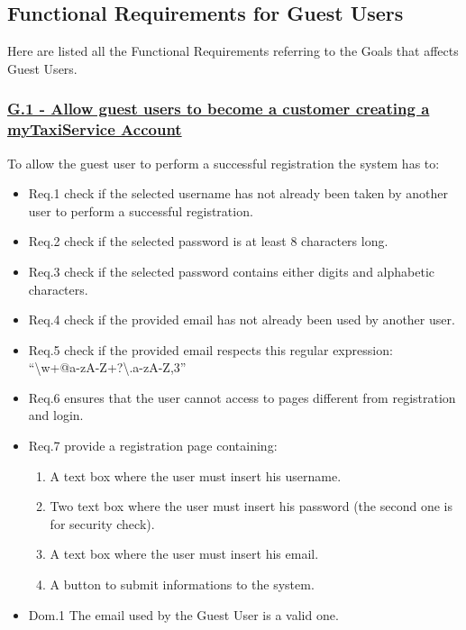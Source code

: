 \documentclass{report}
\begin{document}
		\subsection{Functional Requirements for Guest Users}
		Here are listed all the Functional Requirements referring to the Goals that affects Guest Users.

			\subsubsection{\lbrack \hyperref[sec:g1]{G.1 - Allow guest users to become a customer creating a myTaxiService Account}\rbrack}\label{sec:frs1}
			To allow the guest user to perform a successful registration the system has to:

				\begin{itemize}
					\item \lbrack Req.1\rbrack \label{sec:fr1_g1} check if the selected username has not already been taken by another user to perform a successful registration.
					\item \lbrack Req.2\rbrack \label{sec:fr2_g1} check if the selected password is at least 8 characters long.
					\item \lbrack Req.3\rbrack \label{sec:fr3_g1} check if the selected password contains either digits and alphabetic characters.
					\item \lbrack Req.4\rbrack \label{sec:fr4_g1} check if the provided email has not already been used by another user.
					\item \lbrack Req.5\rbrack \label{sec:fr5_g1} check if the provided email respects this regular expression:\\ \textquotedblleft\textbackslash w+@\lbrack a-zA-Z\textunderscore\rbrack +?\textbackslash .\lbrack a-zA-Z\rbrack{},3\textbraceright\textdollar\textquotedblright
					\item \lbrack Req.6\rbrack \label{sec:fr6_g1} ensures that the user cannot access to pages different from registration and login.
					\item \lbrack Req.7\rbrack \label{sec:fr7_g1} provide a registration page containing:
						\begin{enumerate}
							\item A text box where the user must insert his username.
							\item Two text box where the user must insert his password (the second one is for security check).
							\item A text box where the user must insert his email. 
							\item A button to submit informations to the system.
						\end{enumerate}
					\item \lbrack Dom.1\rbrack \label{sec:da1_g1} The email used by the Guest User is a valid one.
				\end{itemize}
\end{document}

